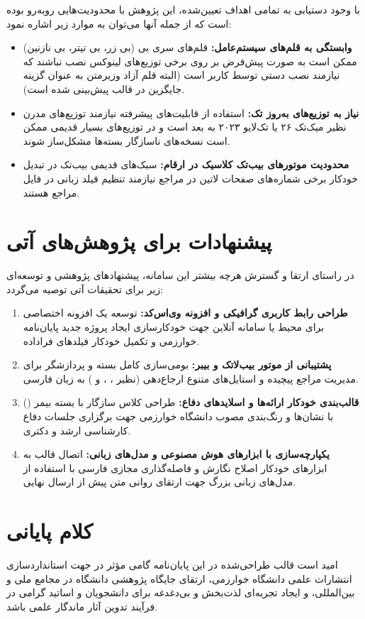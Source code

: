 با وجود دستیابی به تمامی اهداف تعیین‌شده، این پژوهش با محدودیت‌هایی روبه‌رو بوده است که از جمله آنها می‌توان به موارد زیر اشاره نمود:
\begin{itemize}
  \item \textbf{وابستگی به قلم‌های سیستم‌عامل:} قلم‌های سری بی (بی زر، بی تیتر، بی نازنین) ممکن است به صورت پیش‌فرض بر روی برخی توزیع‌های لینوکس نصب نباشند که نیازمند نصب دستی توسط کاربر است (البته قلم آزاد وزیرمتن به عنوان گزینه جایگزین در قالب پیش‌بینی شده است).
  \item \textbf{نیاز به توزیع‌های به‌روز تک:} استفاده از قابلیت‌های پیشرفته نیازمند توزیع‌های مدرن نظیر میک‌تک ۲۶ یا تک‌لایو ۲۰۲۳ به بعد است و در توزیع‌های بسیار قدیمی ممکن است نسخه‌های ناسازگار بسته‌ها مشکل‌ساز شوند.
  \item \textbf{محدودیت موتورهای بیب‌تک کلاسیک در ارقام:} سبک‌های قدیمی بیب‌تک در تبدیل خودکار برخی شماره‌های صفحات لاتین در مراجع نیازمند تنظیم فیلد زبانی  در فایل مراجع هستند.
\end{itemize}

\section{پیشنهادات برای پژوهش‌های آتی}
\label{sec:ch5_future_work}

در راستای ارتقا و گسترش هرچه بیشتر این سامانه، پیشنهادهای پژوهشی و توسعه‌ای زیر برای تحقیقات آتی توصیه می‌گردد:
\begin{enumerate}
  \item \textbf{طراحی رابط کاربری گرافیکی و افزونه وی‌اس‌کد:} توسعه یک افزونه اختصاصی برای محیط  یا سامانه آنلاین  جهت خودکارسازی ایجاد پروژه جدید پایان‌نامه خوارزمی و تکمیل خودکار فیلدهای فراداده.
  \item \textbf{پشتیبانی از موتور بیب‌لاتک و بیبر:} بومی‌سازی کامل بسته  و پردازشگر  برای مدیریت مراجع پیچیده و استایل‌های متنوع ارجاع‌دهی (نظیر ، ، و ) به زبان فارسی.
  \item \textbf{قالب‌بندی خودکار ارائه‌ها و اسلایدهای دفاع:} طراحی کلاس سازگار با بسته بیمر () با نشان‌ها و رنگ‌بندی مصوب دانشگاه خوارزمی جهت برگزاری جلسات دفاع کارشناسی ارشد و دکتری.
  \item \textbf{یکپارچه‌سازی با ابزارهای هوش مصنوعی و مدل‌های زبانی:} اتصال قالب به ابزارهای خودکار اصلاح نگارش و فاصله‌گذاری مجازی فارسی با استفاده از مدل‌های زبانی بزرگ جهت ارتقای روانی متن پیش از ارسال نهایی.
\end{enumerate}

\section{کلام پایانی}
\label{sec:ch5_epilogue}

امید است قالب طراحی‌شده در این پایان‌نامه گامی مؤثر در جهت استانداردسازی انتشارات علمی دانشگاه خوارزمی، ارتقای جایگاه پژوهشی دانشگاه در مجامع ملی و بین‌المللی، و ایجاد تجربه‌ای لذت‌بخش و بی‌دغدغه برای دانشجویان و اساتید گرامی در فرآیند تدوین آثار ماندگار علمی باشد.
